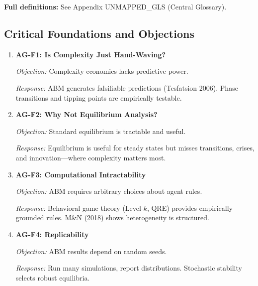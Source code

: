 \textbf{Full definitions:} See Appendix UNMAPPED_GLS (Central Glossary).

\subsection{Critical Foundations and Objections}
\label{sec:ag-foundations}


\begin{enumerate}
    \item \textbf{AG-F1: Is Complexity Just Hand-Waving?}

    \textit{Objection:} Complexity economics lacks predictive power.

    \textit{Response:} ABM generates falsifiable predictions (Tesfatsion 2006).
    Phase transitions and tipping points are empirically testable.

    \item \textbf{AG-F2: Why Not Equilibrium Analysis?}

    \textit{Objection:} Standard equilibrium is tractable and useful.

    \textit{Response:} Equilibrium is useful for steady states but misses
    transitions, crises, and innovation---where complexity matters most.

    \item \textbf{AG-F3: Computational Intractability}

    \textit{Objection:} ABM requires arbitrary choices about agent rules.

    \textit{Response:} Behavioral game theory (Level-$k$, QRE) provides
    empirically grounded rules. M\&N (2018) shows heterogeneity is structured.

    \item \textbf{AG-F4: Replicability}

    \textit{Objection:} ABM results depend on random seeds.

    \textit{Response:} Run many simulations, report distributions. Stochastic
    stability selects robust equilibria.
\end{enumerate}

